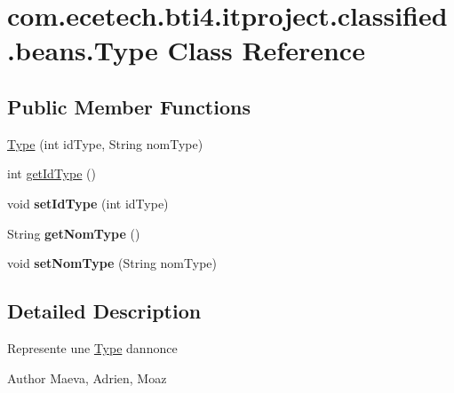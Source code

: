 \hypertarget{classcom_1_1ecetech_1_1bti4_1_1itproject_1_1classified_1_1beans_1_1_type}{}\section{com.\+ecetech.\+bti4.\+itproject.\+classified.\+beans.\+Type Class Reference}
\label{classcom_1_1ecetech_1_1bti4_1_1itproject_1_1classified_1_1beans_1_1_type}
\subsection*{Public Member Functions}
\begin{DoxyCompactItemize}
\item 
\hyperlink{classcom_1_1ecetech_1_1bti4_1_1itproject_1_1classified_1_1beans_1_1_type_a2eb75ec9d297f6068d5876399d3762ff}{Type} (int id\+Type, String nom\+Type)
\item 
int \hyperlink{classcom_1_1ecetech_1_1bti4_1_1itproject_1_1classified_1_1beans_1_1_type_a19eef86aaf345536fbf7cf6907f818f4}{get\+Id\+Type} ()
\item 
void {\bfseries set\+Id\+Type} (int id\+Type)\hypertarget{classcom_1_1ecetech_1_1bti4_1_1itproject_1_1classified_1_1beans_1_1_type_a2db24270c028fe2749017260bf8eba4a}{}\label{classcom_1_1ecetech_1_1bti4_1_1itproject_1_1classified_1_1beans_1_1_type_a2db24270c028fe2749017260bf8eba4a}

\item 
String {\bfseries get\+Nom\+Type} ()\hypertarget{classcom_1_1ecetech_1_1bti4_1_1itproject_1_1classified_1_1beans_1_1_type_a2d201d59213e7f3663149f3a00642dcc}{}\label{classcom_1_1ecetech_1_1bti4_1_1itproject_1_1classified_1_1beans_1_1_type_a2d201d59213e7f3663149f3a00642dcc}

\item 
void {\bfseries set\+Nom\+Type} (String nom\+Type)\hypertarget{classcom_1_1ecetech_1_1bti4_1_1itproject_1_1classified_1_1beans_1_1_type_affc178ef83dd89857a2b3063bfef2279}{}\label{classcom_1_1ecetech_1_1bti4_1_1itproject_1_1classified_1_1beans_1_1_type_affc178ef83dd89857a2b3063bfef2279}

\end{DoxyCompactItemize}


\subsection{Detailed Description}
Represente une \hyperlink{classcom_1_1ecetech_1_1bti4_1_1itproject_1_1classified_1_1beans_1_1_type}{Type} d\textquotesingle{}annonce \begin{DoxyAuthor}{Author}
Maeva, Adrien, Moaz 
\end{DoxyAuthor}


